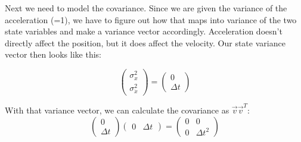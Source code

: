 \documentclass[10pt]{article}
\begin{document}
\begin{enumerate}
\begin{enumerate}
  Next we need to model the covariance. Since we are given the variance of the
  acceleration (=1), we have to figure out how that maps into variance of the
  two state variables and make a variance vector accordingly. Acceleration
  doesn't directly affect the position, but it does affect the velocity. Our
  state variance vector then looks like this:

  $$
\begin{pmatrix}\sigma_x^2 \\ \sigma_{\dot{x}}^2\end{pmatrix} = 
\begin{pmatrix}0 \\ \Delta t\end{pmatrix}
  $$

  With that variance vector, we can calculate the covariance as
  $\vec{v}\vec{v}^T$:
  $$
\begin{pmatrix}0 \\ \Delta t\end{pmatrix}\begin{pmatrix}0 & \Delta
t\end{pmatrix} = 
\begin{pmatrix}0 & 0 \\ 0 & \Delta t^2\end{pmatrix}
$$

  \end{enumerate}

\end{enumerate}
\end{document}
